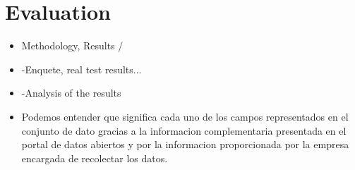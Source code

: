 \newpage
\section{Evaluation}
\begin{itemize}
   \item  { Methodology, Results } / 
   \item   -Enquete, real test results...
   \item   -Analysis of the results   
   \item   Podemos entender  que significa cada uno de los campos representados en el conjunto de dato gracias a la informacion
   complementaria presentada en el portal de datos abiertos y por la informacion proporcionada por la empresa encargada de 
   recolectar los datos.
\end{itemize}
